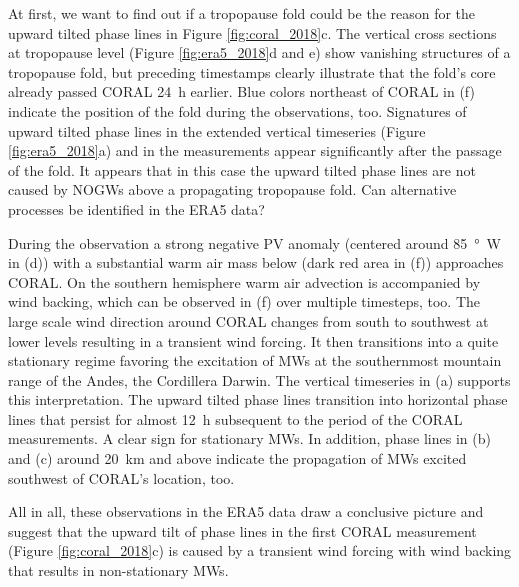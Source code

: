 At first, we want to find out if a tropopause fold could be the reason for the upward tilted phase lines in Figure \ref{fig:coral_2018}c. The vertical cross sections at tropopause level (Figure \ref{fig:era5_2018}d and e) show vanishing structures of a tropopause fold, but preceding timestamps clearly illustrate that the fold's core already passed CORAL \SI{24}{h} earlier. Blue colors northeast of CORAL in (f) indicate the position of the fold during the observations, too. Signatures of upward tilted phase lines in the extended vertical timeseries (Figure \ref{fig:era5_2018}a) and in the measurements appear significantly after the passage of the fold. It appears that in this case the upward tilted phase lines are not caused by NOGWs above a propagating tropopause fold. Can alternative processes be identified in the ERA5 data?

During the observation a strong negative PV anomaly (centered around \SI{85}{\degree W} in (d)) with a substantial warm air mass below (dark red area in (f)) approaches CORAL. On the southern hemisphere warm air advection is accompanied by wind backing, which can be observed in (f) over multiple timesteps, too. The large scale wind direction around CORAL changes from south to southwest at lower levels resulting in a transient wind forcing. It then transitions into a quite stationary regime favoring the excitation of MWs at the southernmost mountain range of the Andes, the Cordillera Darwin. The vertical timeseries in (a) supports this interpretation. The upward tilted phase lines transition into horizontal phase lines that persist for almost \SI{12}{h} subsequent to the period of the CORAL measurements. A clear sign for stationary MWs. In addition, phase lines in (b) and (c) around \SI{20}{\kilo\meter} and above indicate the propagation of MWs excited southwest of CORAL's location, too.

All in all, these observations in the ERA5 data draw a conclusive picture and suggest that the upward tilt of phase lines in the first CORAL measurement (Figure \ref{fig:coral_2018}c) is caused by a transient wind forcing with wind backing that results in non-stationary MWs. 
